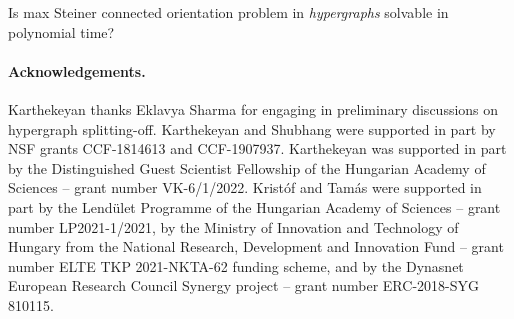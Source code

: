 \documentclass{article}
\newcommand{\functionMaximizationOracleStrongCover}[1]{\ensuremath{{#1}\text{-}\mathtt{max}\text{-}\mathtt{sc}\text{-}\mathtt{Oracle}}\xspace}
\newcommand{\shubhang}[1]{{\color{blue}[{\tiny Shubhang: \bf #1}]\marginpar{\color{blue}*}}}
\newcommand{\knote}[1]{{\color{red}[{\tiny Karthik: \bf #1}]\marginpar{\color{red}*}}}
\begin{document}
\begin{enumerate}
    Is max Steiner connected orientation problem in \emph{hypergraphs} solvable in polynomial time? 
\end{enumerate} 

\medskip
\paragraph{Acknowledgements.} 
Karthekeyan thanks Eklavya Sharma for engaging in preliminary discussions on hypergraph splitting-off. 
Karthekeyan and Shubhang were supported in part by NSF grants CCF-1814613 and CCF-1907937. 
Karthekeyan was supported in part by the Distinguished Guest Scientist Fellowship of the Hungarian Academy of Sciences -- grant number VK-6/1/2022. 
Krist\'{o}f and Tam\'{a}s were supported in part 
by the Lend\"ulet Programme of the Hungarian Academy of Sciences -- grant number LP2021-1/2021, by the Ministry of Innovation and Technology of Hungary from the National Research, Development and Innovation Fund -- grant number ELTE TKP 2021-NKTA-62 funding scheme, and by the Dynasnet European Research Council Synergy project -- grant number ERC-2018-SYG 810115.
\end{document}
